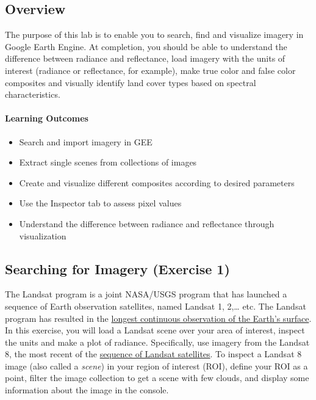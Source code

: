 \documentclass[
]{article}
\providecommand{\tightlist}{%
  \setlength{\itemsep}{0pt}\setlength{\parskip}{0pt}}
\begin{document}
\hypertarget{overview-2}{%
\subsection*{Overview}\label{overview-2}}

The purpose of this lab is to enable you to search, find and visualize imagery in Google Earth Engine. At completion, you should be able to understand the difference between radiance and reflectance, load imagery with the units of interest (radiance or reflectance, for example), make true color and false color composites and visually identify land cover types based on spectral characteristics.

\hypertarget{learning-outcomes-2}{%
\paragraph*{Learning Outcomes}\label{learning-outcomes-2}}

\begin{itemize}
\tightlist
\item
  Search and import imagery in GEE
\item
  Extract single scenes from collections of images
\item
  Create and visualize different composites according to desired parameters
\item
  Use the Inspector tab to assess pixel values
\item
  Understand the difference between radiance and reflectance through visualization
\end{itemize}

\hypertarget{searching-for-imagery-exercise-1}{%
\subsection{Searching for Imagery (Exercise 1)}\label{searching-for-imagery-exercise-1}}

The Landsat program is a joint NASA/USGS program that has launched a sequence of Earth observation satellites, named Landsat 1, 2,\ldots{} etc. The Landsat program has resulted in the \href{https://www.youtube.com/embed/ZZx1xmNGcXI?list=PLD240BBC85537B9BE}{longest continuous observation of the Earth's surface}. In this exercise, you will load a Landsat scene over your area of interest, inspect the units and make a plot of radiance. Specifically, use imagery from the Landsat 8, the most recent of the \href{https://www.usgs.gov/core-science-systems/nli/landsat/landsat-8}{sequence of Landsat satellites}. To inspect a Landsat 8 image (also called a \emph{scene}) in your region of interest (ROI), define your ROI as a point, filter the image collection to get a scene with few clouds, and display some information about the image in the console.
\end{document}
